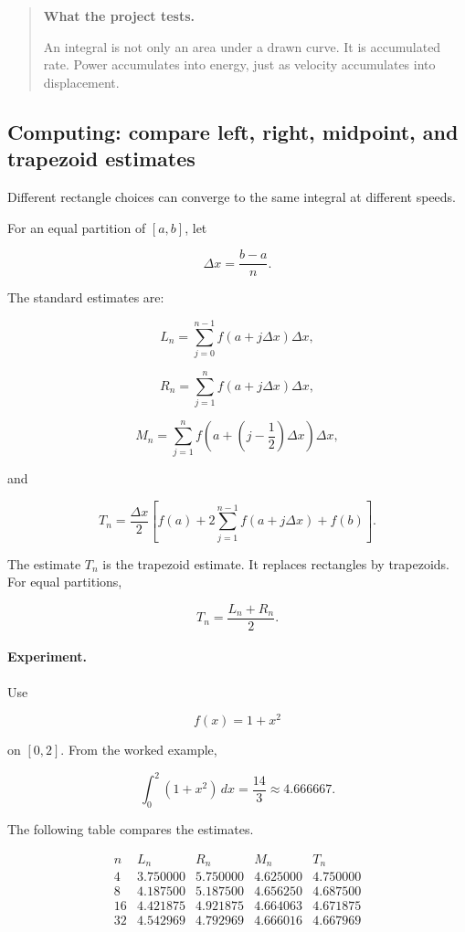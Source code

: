 \begin{quote}
\textbf{What the project tests.}

An integral is not only an area under a drawn curve.  It is accumulated rate.
Power accumulates into energy, just as velocity accumulates into displacement.
\end{quote}

\subsection{Computing: compare left, right, midpoint, and trapezoid estimates}
\label{subsec:computing-compare-riemann-estimates}

Different rectangle choices can converge to the same integral at different speeds.

For an equal partition of \([a,b]\), let

\[
\Delta x=\frac{b-a}{n}.
\]

The standard estimates are:

\[
L_n=\sum_{j=0}^{n-1} f(a+j\Delta x)\Delta x,
\]

\[
R_n=\sum_{j=1}^{n} f(a+j\Delta x)\Delta x,
\]

\[
M_n=\sum_{j=1}^{n}
f\left(a+\left(j-\frac12\right)\Delta x\right)\Delta x,
\]

and

\[
T_n=
\frac{\Delta x}{2}
\left[
f(a)+2\sum_{j=1}^{n-1}f(a+j\Delta x)+f(b)
\right].
\]

The estimate \(T_n\) is the trapezoid estimate.  It replaces rectangles by trapezoids.
For equal partitions,

\[
T_n=\frac{L_n+R_n}{2}.
\]

\paragraph{Experiment.}
Use

\[
f(x)=1+x^2
\]

on \([0,2]\).  From the worked example,

\[
\int_0^2(1+x^2)\,dx=\frac{14}{3}\approx4.666667.
\]

The following table compares the estimates.

\[
\begin{array}{c|cccc}
n & L_n & R_n & M_n & T_n \\ \hline
4  & 3.750000 & 5.750000 & 4.625000 & 4.750000 \\
8  & 4.187500 & 5.187500 & 4.656250 & 4.687500 \\
16 & 4.421875 & 4.921875 & 4.664063 & 4.671875 \\
32 & 4.542969 & 4.792969 & 4.666016 & 4.667969
\end{array}
\]

